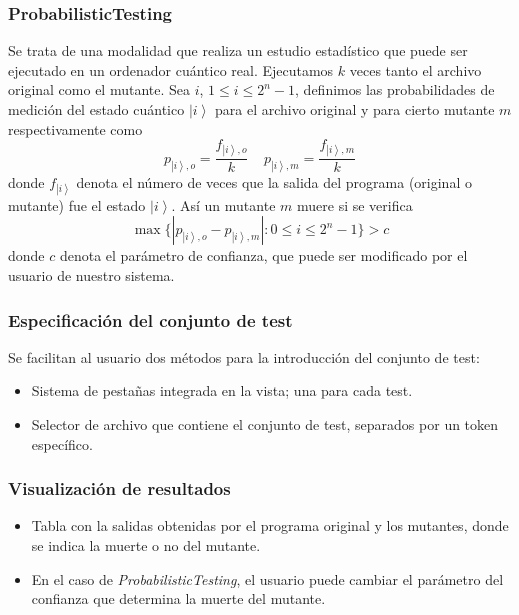 \documentclass{beamer}
\newcommand{\ket}[1]{\left|#1\right\rangle}
\begin{document}
\begin{frame}
	\frametitle{ProbabilisticTesting}
	
	Se trata de una modalidad que realiza un estudio estadístico que puede ser ejecutado en un ordenador cuántico real. Ejecutamos $k$ veces tanto el archivo original como el mutante. Sea $i$, $1\leq i\leq 2^n-1$, definimos las probabilidades de medición del estado cuántico $\ket i$ para el archivo original y para cierto  mutante $m$ respectivamente como
$$p_{\ket i,o}=\dfrac{f_{\ket i,o}}{k}\ \ \ \ \ p_{\ket i,m}=\dfrac{f_{\ket i,m}}{k}
$$
donde $f_{\ket i}$ denota el número de veces que la salida del programa (original o mutante) fue el estado $\ket i$. Así un mutante $m$ muere si se verifica
$$
\max \{|p_{\ket i,o}-p_{\ket i,m}|:0\leq i\leq 2^n - 1\}> c
$$
donde $c$ denota el parámetro de confianza, que puede ser modificado por el usuario de nuestro sistema.
\end{frame}

\begin{frame}
	\frametitle{Especificación del conjunto de test}
	Se facilitan al usuario dos métodos para la introducción del conjunto de test:
	\begin{itemize}
		\item Sistema de pestañas integrada en la vista; una para cada test.
		\item Selector de archivo que contiene el conjunto de test, separados por un token específico.
	\end{itemize}
\end{frame}

\begin{frame}
	\frametitle{Visualización de resultados}
	\begin{itemize}
		\item Tabla con la salidas obtenidas por el programa original y los mutantes, donde se indica la muerte o no del mutante.
		\item En el caso de \textit{ProbabilisticTesting}, el usuario puede cambiar el parámetro del confianza que determina la muerte del mutante.
	\end{itemize}
\end{frame}
\end{document}
